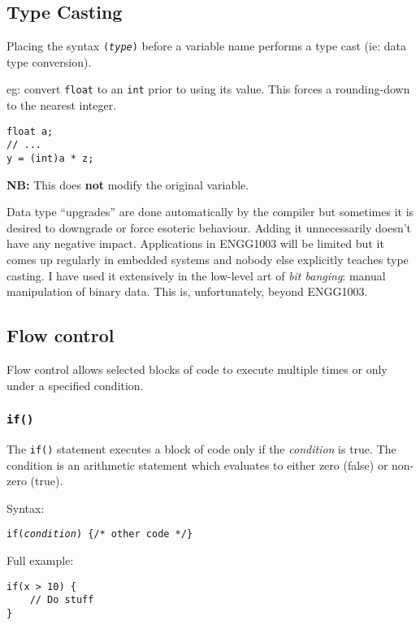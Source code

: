 \documentclass{lab}
\begin{document}
\begin{multicols}{2}
\subsection{Type Casting}
Placing the syntax \texttt{(\textit{type})} before a variable name performs a type cast (ie: data type conversion).

eg: convert \texttt{float} to an \texttt{int} prior to using its value. This forces a rounding-down to the nearest integer.

\begin{lstlisting}[style=CStyle]
float a;
// ...
y = (int)a * z;
\end{lstlisting}

\textbf{NB:} This does \textbf{not} modify the original variable.

Data type ``upgrades'' are done automatically by the compiler but sometimes it is desired to downgrade or force esoteric behaviour. Adding it unnecessarily doesn't have any negative impact. Applications in ENGG1003 will be limited but it comes up regularly in embedded systems and nobody else explicitly teaches type casting. I have used it extensively in the low-level art of \textit{bit banging}: manual manipulation of binary data. This is, unfortunately, beyond ENGG1003.

\subsection{Flow control}

Flow control allows selected blocks of code to execute multiple times or only under a specified condition.

\subsubsection{\texttt{if()}}

The \texttt{if()} statement executes a block of code only if the \textit{condition} is true. The condition is an arithmetic statement which evaluates to either zero (false) or non-zero (true).

Syntax:

\texttt{if(\textit{condition}) \{/* other code */\}}

Full example:

\begin{lstlisting}[style=CStyle]
if(x > 10) {
	// Do stuff
}
\end{lstlisting}


\end{multicols}
\end{document}
